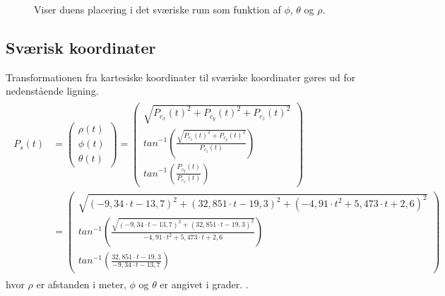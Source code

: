\begin{figure}[!th]
\centering
\begin{tikzpicture}[scale=4]

\end{tikzpicture}
\caption[Sværisk koordinatsystem til koordinattransformation]{Viser duens placering i det sværiske rum som funktion af  \(\phi\), \(\theta\) og \(\rho\).}
\label{fig:thetaphi_degree}
\end{figure}

\subsection{Sværisk koordinater}
Transformationen fra kartesiske koordinater til sværiske koordinater gøres ud for nedenstående ligning.
\begin{align}
\begin{split}
{ P }_{ s }\left( t \right) &=\left( \begin{matrix} \rho \left( t \right)  \\ \phi \left( t \right)  \\ \theta \left( t \right)  \end{matrix} \right)  =\left( \begin{matrix} \sqrt { { { P }_{ c_x }\left( t \right) }^{ 2 }+{ { P }_{ c_y }\left( t \right) }^{ 2 }+{ { P }_{ c_z }\left( t \right) }^{ 2 } }  \\ { tan }^{ -1 }\left( \frac { \sqrt { { { P }_{ c_x }\left( t \right) }^{ 2 }+{ { P }_{ c_y }\left( t \right) }^{ 2 } }  }{ { P }_{ c_z }\left( t \right) }  \right)  \\ { tan }^{ -1 }\left( \frac { { P }_{ c_y }\left( t \right) }{ { P }_{ c_x }\left( t \right) }  \right)  \end{matrix} \right) 
\\
 &=\left( \begin{matrix} \sqrt { { \left( -9,34\cdot t-13,7 \right)  }^{ 2 }+{ \left( 32,851\cdot t-19,3 \right)  }^{ 2 }+{ \left( -{ 4,91\cdot t }^{ 2 }+5,473\cdot t+2,6 \right)  }^{ 2 } }  \\ { tan }^{ -1 }\left( \frac { \sqrt { { \left( -9,34\cdot t-13,7 \right)  }^{ 2 }+{ \left( 32,851\cdot t-19,3 \right)  }^{ 2 } }  }{  -{ 4,91\cdot t }^{ 2 }+5,473\cdot t+2,6 }  \right)  \\ { tan }^{ -1 }\left( \frac { 32,851\cdot t-19,3 }{ -9,34\cdot t-13,7 }  \right)  \end{matrix} \right) 
\label{eq:sv_koordi}
\end{split}
\end{align}
hvor \(\rho\) er afstanden i meter, \(\phi\) og \(\theta\) er angivet i grader. \citep[Kap. 10.6, s. 598]{adam}.
